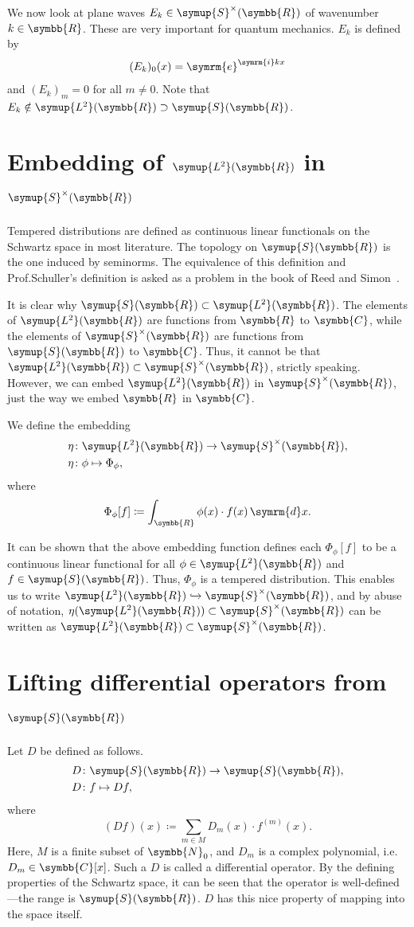 \documentclass[11pt, a4paper]{article}
\theoremstyle{definition}
\newcommand{\ltwo}{\symup{L^2}}
\newcommand{\rr}{\symbb{R}}
\newcommand{\cc}{\symbb{C}}
\newcommand{\nn}{\symbb{N}_0}
\newcommand{\ltwor}{\ltwo(\rr)}
\newcommand{\schwartz}{\symup{S}}
\newcommand{\schwartzr}{\schwartz(\rr)}
\newcommand{\dist}{\schwartz^\times}
\newcommand{\distr}{\dist(\rr)}
\renewcommand{\i}{\symrm{i}}
\newcommand{\e}{\symrm{e}}
\newcommand{\der}{\mathop{}\!\symrm{d}}
\begin{document}
    We now look at plane waves $E_k \in \distr$ of wavenumber $k \in \rr$. These are very important for quantum mechanics. $E_k$ is defined by \[(E_k)_0 (x) = \e^{\i kx}\] and $(E_k)_m = 0$ for all $m \neq 0$. Note that $E_k \notin \ltwor \supset \schwartzr$.

    \section{Embedding of \texorpdfstring{\(\ltwor\)}{L²(ℝ)} in \texorpdfstring{\(\distr\)}{S⁺(ℝ)}}

    Tempered distributions are defined as continuous linear functionals on the Schwartz space in most literature. The topology on $\schwartzr$ is the one induced by seminorms. The equivalence of this definition and Prof.\@ Schuller's definition is asked as a problem in the book of Reed and Simon~\cite[prob.~24, chp.~5, p.~176]{Reed}.

    It is clear why $\schwartzr \subset \ltwor$. The elements of $\ltwor$ are functions from $\rr$ to $\cc$, while the elements of $\distr$ are functions from $\schwartzr$ to $\cc$. Thus, it cannot be that $\ltwor \subset \distr$, strictly speaking. However, we can embed $\ltwor$ in $\distr$, just the way we embed $\rr$ in $\cc$.

    We define the embedding
    \begin{align*}
        \eta &\colon \ltwor \rightarrow \distr,\\
        \eta &\colon \phi \mapsto \Phi_\phi,
    \end{align*}
    where
    \[
    \Phi_\phi [f] \coloneq \int_{\rr} \phi(x) \cdot f(x) \der x.
    \]

    It can be shown that the above embedding function defines each $\Phi_\phi[f]$ to be a continuous linear functional for all $\phi \in \ltwor$ and $f \in \schwartzr$. Thus, $\Phi_\phi$ is a tempered distribution. This enables us to write $\ltwor \xhookrightarrow{} \distr$, and by abuse of notation, $\eta (\ltwor) \subset \distr$ can be written as $\ltwor \subset \distr$.

    \section{Lifting differential operators from \texorpdfstring{\(\schwartzr\)}{S(ℝ)}}

    Let $D$ be defined as follows.
    \begin{align*}
        D &\colon \schwartzr \rightarrow \schwartzr,\\
        D &\colon f \mapsto Df,
    \end{align*}
    where
    \[
    (Df)(x) \coloneq \sum_{m \in M} D_m(x) \cdot f^{(m)} (x).
    \]
    Here, $M$ is a finite subset of $\nn$, and $D_m$ is a complex polynomial, i.e.\@ $D_m \in \cc[x]$. Such a $D$ is called a differential operator. By the defining properties of the Schwartz space, it can be seen that the operator is well-defined---the range is $\schwartzr$. $D$ has this nice property of mapping into the space itself.
\end{document}
